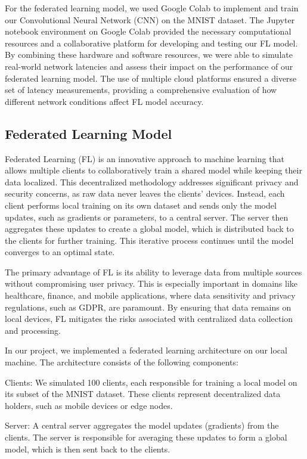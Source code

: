 \documentclass[conference]{IEEEtran}
\begin{document}
For the federated learning model, we used Google Colab to implement and train our Convolutional Neural Network (CNN) on the MNIST dataset. The Jupyter notebook environment on Google Colab provided the necessary computational resources and a collaborative platform for developing and testing our FL model. By combining these hardware and software resources, we were able to simulate real-world network latencies and assess their impact on the performance of our federated learning model. The use of multiple cloud platforms ensured a diverse set of latency measurements, providing a comprehensive evaluation of how different network conditions affect FL model accuracy.

\subsection{Federated Learning Model}

Federated Learning (FL) is an innovative approach to machine learning that allows multiple clients to collaboratively train a shared model while keeping their data localized. This decentralized methodology addresses significant privacy and security concerns, as raw data never leaves the clients' devices. Instead, each client performs local training on its own dataset and sends only the model updates, such as gradients or parameters, to a central server. The server then aggregates these updates to create a global model, which is distributed back to the clients for further training. This iterative process continues until the model converges to an optimal state.

The primary advantage of FL is its ability to leverage data from multiple sources without compromising user privacy. This is especially important in domains like healthcare, finance, and mobile applications, where data sensitivity and privacy regulations, such as GDPR, are paramount. By ensuring that data remains on local devices, FL mitigates the risks associated with centralized data collection and processing.

In our project, we implemented a federated learning architecture on our local machine. The architecture consists of the following components:

Clients: We simulated 100 clients, each responsible for training a local model on its subset of the MNIST dataset. These clients represent decentralized data holders, such as mobile devices or edge nodes.

Server: A central server aggregates the model updates (gradients) from the clients. The server is responsible for averaging these updates to form a global model, which is then sent back to the clients.
\end{document}
